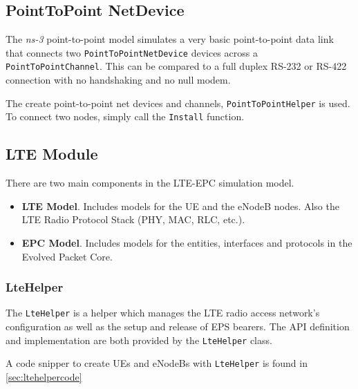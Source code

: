 \subsection{PointToPoint NetDevice}
The \textit{ns-3} point-to-point model simulates a very basic point-to-point data link that connects 
two \texttt{PointToPointNetDevice} devices across a \texttt{PointToPointChannel}. This can be compared to a 
full duplex RS-232 or RS-422 connection with no handshaking and no null modem.

The create point-to-point net devices and channels, \texttt{PointToPointHelper} is used. To
connect two nodes, simply call the \texttt{Install} function.

\subsection{LTE Module}
There are two main components in the LTE-EPC simulation model.

\begin{itemize}[topsep=0pt, noitemsep]
  \item \textbf{LTE Model}. Includes models for the UE and the eNodeB nodes. Also the LTE Radio Protocol
  Stack (PHY, MAC, RLC, etc.).

  \item \textbf{EPC Model}. Includes models for the entities, interfaces and protocols in the Evolved Packet Core.
\end{itemize}

\subsubsection{LteHelper}
The \texttt{LteHelper} is a helper which manages the LTE radio access network's 
configuration as well as the setup and release of EPS bearers. The API definition and 
implementation are both provided by the \texttt{LteHelper} class.

A code snipper to create UEs and eNodeBs with \texttt{LteHelper} is found in \autoref{sec:ltehelpercode}

